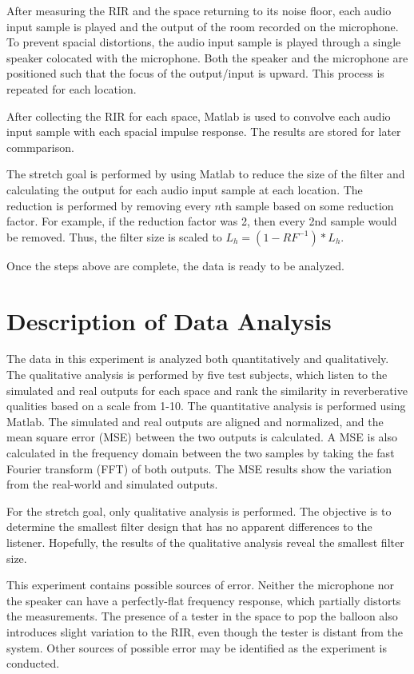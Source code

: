 \documentclass[letterpaper, 11pt, onecolumn, oneside]{article}
\begin{document}
After measuring the RIR and the space returning to its noise floor, each audio
input sample is played and the output of the room recorded on the microphone.
To prevent spacial distortions, the audio input sample is played through a
single speaker colocated with the microphone. Both the speaker and the
microphone are positioned such that the focus of the output/input is upward.
This process is repeated for each location.

After collecting the RIR for each space, Matlab is used to convolve each audio
input sample with each spacial impulse response. The results are stored for
later commparison.

The stretch goal is performed by using Matlab to reduce the size of the filter
and calculating the output for each audio input sample at each location. The
reduction is performed by removing every $n$th sample based on some reduction
factor. For example, if the reduction factor was 2, then every 2nd sample would
be removed. Thus, the filter size is scaled to $L_{h} = (1 - RF^{-1})*L_{h}$.

Once the steps above are complete, the data is ready to be analyzed.

\section*{Description of Data Analysis}
The data in this experiment is analyzed both quantitatively and qualitatively.
The qualitative analysis is performed by five test subjects, which listen to
the simulated and real outputs for each space and rank the similarity in
reverberative qualities based on a scale from 1-10. The quantitative analysis
is performed using Matlab. The simulated and real outputs are aligned
and normalized, and the mean square error (MSE) between the two outputs is
calculated. A MSE is also calculated in the frequency domain between the two
samples by taking the fast Fourier transform (FFT) of both outputs. The MSE
results show the variation from the real-world and simulated outputs.

For the stretch goal, only qualitative analysis is performed. The objective is
to determine the smallest filter design that has no apparent differences to the
listener. Hopefully, the results of the qualitative analysis reveal the
smallest filter size.

This experiment contains possible sources of error. Neither the microphone nor
the speaker can have a perfectly-flat frequency response, which partially
distorts the measurements. The presence of a tester in the space to pop the
balloon also introduces slight variation to the RIR, even though the tester is
distant from the system. Other sources of possible error may be identified as
the experiment is conducted.
\end{document}
